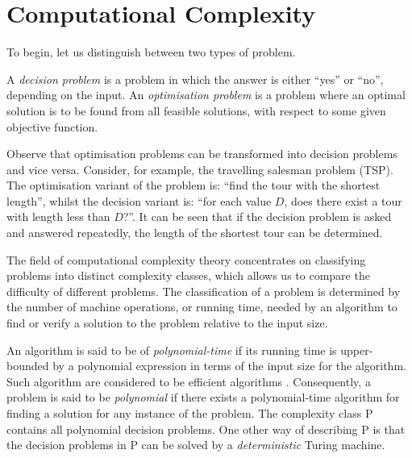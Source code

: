 \documentclass[a4paper,11pt]{article}
\begin{document}

\section{Computational Complexity}
\label{sec:complexity}

\noindent To begin, let us distinguish between two types of problem.

\begin{definition}
	A \emph{decision problem} is a problem in which the answer is either ``yes'' or ``no'', depending on the input. An \emph{optimisation problem} is a problem where an optimal solution is to be found from all feasible solutions, with respect to some given objective function.
	\label{defn:problems}
\end{definition}

\noindent Observe that optimisation problems can be transformed into decision problems and vice versa. Consider, for example, the travelling salesman problem (TSP). The optimisation variant of the problem is: ``find the tour with the shortest length'', whilst the decision variant is: ``for each value $D$, does there exist a tour with length less than $D$?''. It can be seen that if the decision problem is asked and answered repeatedly, the length of the shortest tour can be determined. 

The field of computational complexity theory concentrates on classifying problems into distinct complexity classes, which allows us to compare the difficulty of different problems. The classification of a problem is determined by the number of machine operations, or running time, needed by an algorithm to find or verify a solution to the problem relative to the input size.

An algorithm is said to be of \emph{polynomial-time} if its running time is upper-bounded by a polynomial expression in terms of the input size for the algorithm. Such algorithm are considered to be efficient algorithms \citep{edmonds1965, cobham1965}. Consequently, a problem is said to be \emph{polynomial} if there exists a polynomial-time algorithm for finding a solution for any instance of the problem. The complexity class P contains all polynomial decision problems. One other way of describing P is that the decision problems in P can be solved by a \emph{deterministic} Turing machine.
\end{document}
